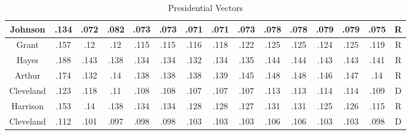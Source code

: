 \begin{sidewaystable}
\begin{singlespace}
\begin{center}
\begin{tabular}{||c c c c c c c c c c c c c c c||}
\hline
Johnson & .134 & .072 & .082 & .073 & .073 & .071 & .071 & .073 & .078 & .078 & .079 & .079 & .075 & R \\ 
\hline
Grant & .157 & .12 & .12 & .115 & .115 & .116 & .118 & .122 & .125 & .125 & .124 & .125 & .119 & R \\ 
\hline
Hayes & .188 & .143 & .138 & .134 & .134 & .132 & .134 & .135 & .144 & .144 & .143 & .143 & .141 & R \\ 
\hline
Arthur & .174 & .132 & .14 & .138 & .138 & .138 & .139 & .145 & .148 & .148 & .146 & .147 & .14 & R \\ 
\hline
Cleveland & .123 & .118 & .11 & .108 & .108 & .107 & .107 & .107 & .113 & .113 & .114 & .114 & .109 & D \\ 
\hline
Harrison & .153 & .14 & .138 & .134 & .134 & .128 & .128 & .127 & .131 & .131 & .125 & .126 & .115 & R \\ 
\hline
Cleveland & .112 & .101 & .097 & .098 & .098 & .103 & .103 & .103 & .106 & .106 & .103 & .103 & .098 & D \\ 
\hline
\hline
\end{tabular}
\end{center}
\caption{Presidential Vectors}
\label{appendix:vector1}
\end{singlespace}
\end{sidewaystable}

